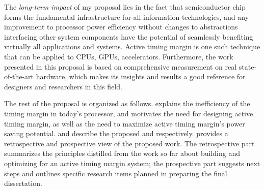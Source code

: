The \textit{long-term impact} of my proposal lies in the fact that semiconductor chip forms the fundamental infrastructure for all information technologies, and any improvement to processor power efficiency without changes to abstractions interfacing other system components have the potential of seamlessly benefiting virtually all applications and systems. Active timing margin is one such technique that can be applied to CPUs, GPUs, accelerators. Furthermore, the work presented in this proposal is based on comprehensive measurement on real state-of-the-art hardware, which makes its insights and results a good reference for designers and researchers in this field.

The rest of the proposal is organized as follows.  explains the inefficiency of the timing margin in today's processor, and motivates the need for designing active timing margin, as well as the need to maximize active timing margin's power saving potential.  and describe the proposed \tistates and \ams respectively.  provides a retrospective and prospective view of the proposed work. The retrospective part summarizes the principles distilled from the work so far about building and optimizing for an active timing margin system; the prospective part suggests next steps and outlines specific research items planned in preparing the final dissertation.
